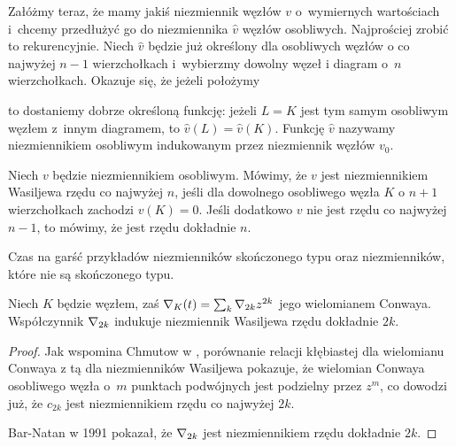 Załóżmy teraz, że mamy jakiś niezmiennik węzłów $v$ o~wymiernych wartościach i~chcemy przedłużyć go do niezmiennika $\hat v$ węzłów osobliwych.
Najprościej zrobić to rekurencyjnie.
Niech $\hat v$ będzie już określony dla osobliwych węzłów o co najwyżej $n - 1$ wierzchołkach i~wybierzmy dowolny węzeł i diagram o~$n$ wierzchołkach.
Okazuje się, że jeżeli położymy

to dostaniemy dobrze określoną funkcję: jeżeli $L = K$ jest tym samym osobliwym węzłem z~innym diagramem, to $\hat v(L) = \hat v(K)$.
Funkcję $\hat v$ nazywamy niezmiennikiem osobliwym indukowanym przez niezmiennik węzłów $v_0$.

\begin{definition}
\label{def:vassiliev_order}%
%
    Niech $v$ będzie niezmiennikiem osobliwym.
    Mówimy, że $v$ jest niezmiennikiem Wasiljewa rzędu co najwyżej $n$, jeśli dla dowolnego osobliwego węzła $K$ o $n + 1$ wierzchołkach zachodzi $v(K) = 0$.
    Jeśli dodatkowo $v$ nie jest rzędu co najwyżej $n - 1$, to mówimy, że jest rzędu dokładnie $n$.
\end{definition}

Czas na garść przykładów niezmienników skończonego typu oraz niezmienników, które nie są skończonego typu.

\begin{example}
%
    Niech $K$ będzie węzłem, zaś $\nabla_K(t) = \sum_k \nabla_{2k} z^{2k}$ jego wielomianem Conwaya.
    Współczynnik $\nabla_{2k}$ indukuje niezmiennik Wasiljewa rzędu dokładnie $2k$.
\end{example}

\begin{proof}
    Jak wspomina Chmutow w \cite{chmutov12}, porównanie relacji kłębiastej dla wielomianu Conwaya z tą dla niezmienników Wasiljewa pokazuje, że wielomian Conwaya osobliwego węzła o~$m$ punktach podwójnych jest podzielny przez $z^m$, co dowodzi już, że $c_{2k}$ jest niezmiennikiem rzędu co najwyżej $2k$.

    Bar-Natan w 1991 pokazał, że $\nabla_{2k}$ jest niezmiennikiem rzędu dokładnie $2k$.
\end{proof}


